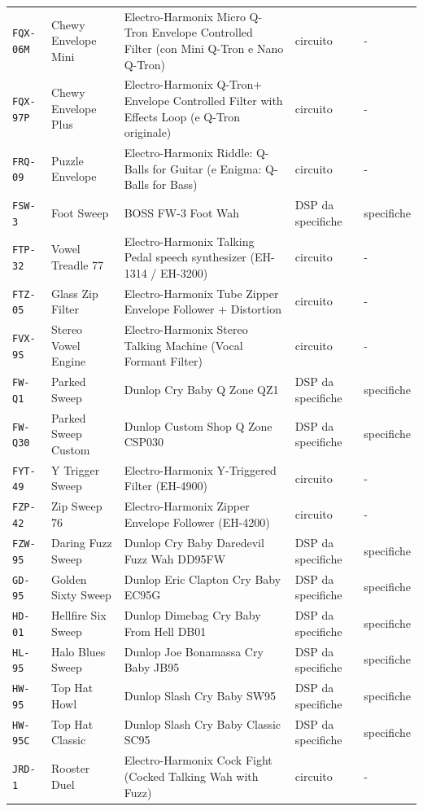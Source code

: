 \begin{xltabular}{\linewidth}{@{}l l X l l@{}}
\texttt{FQX-06M} & Chewy Envelope Mini & Electro-Harmonix Micro Q-Tron Envelope Controlled Filter (con Mini Q-Tron e Nano Q-Tron) & circuito & -\\
\texttt{FQX-97P} & Chewy Envelope Plus & Electro-Harmonix Q-Tron+ Envelope Controlled Filter with Effects Loop (e Q-Tron originale) & circuito & -\\
\texttt{FRQ-09} & Puzzle Envelope & Electro-Harmonix Riddle: Q-Balls for Guitar (e Enigma: Q-Balls for Bass) & circuito & -\\
\texttt{FSW-3} & Foot Sweep & BOSS FW-3 Foot Wah & DSP da specifiche & specifiche\\
\texttt{FTP-32} & Vowel Treadle 77 & Electro-Harmonix Talking Pedal speech synthesizer (EH-1314 / EH-3200) & circuito & -\\
\texttt{FTZ-05} & Glass Zip Filter & Electro-Harmonix Tube Zipper Envelope Follower + Distortion & circuito & -\\
\texttt{FVX-9S} & Stereo Vowel Engine & Electro-Harmonix Stereo Talking Machine (Vocal Formant Filter) & circuito & -\\
\texttt{FW-Q1} & Parked Sweep & Dunlop Cry Baby Q Zone QZ1 & DSP da specifiche & specifiche\\
\texttt{FW-Q30} & Parked Sweep Custom & Dunlop Custom Shop Q Zone CSP030 & DSP da specifiche & specifiche\\
\texttt{FYT-49} & Y Trigger Sweep & Electro-Harmonix Y-Triggered Filter (EH-4900) & circuito & -\\
\texttt{FZP-42} & Zip Sweep 76 & Electro-Harmonix Zipper Envelope Follower (EH-4200) & circuito & -\\
\texttt{FZW-95} & Daring Fuzz Sweep & Dunlop Cry Baby Daredevil Fuzz Wah DD95FW & DSP da specifiche & specifiche\\
\texttt{GD-95} & Golden Sixty Sweep & Dunlop Eric Clapton Cry Baby EC95G & DSP da specifiche & specifiche\\
\texttt{HD-01} & Hellfire Six Sweep & Dunlop Dimebag Cry Baby From Hell DB01 & DSP da specifiche & specifiche\\
\texttt{HL-95} & Halo Blues Sweep & Dunlop Joe Bonamassa Cry Baby JB95 & DSP da specifiche & specifiche\\
\texttt{HW-95} & Top Hat Howl & Dunlop Slash Cry Baby SW95 & DSP da specifiche & specifiche\\
\texttt{HW-95C} & Top Hat Classic & Dunlop Slash Cry Baby Classic SC95 & DSP da specifiche & specifiche\\
\texttt{JRD-1} & Rooster Duel & Electro-Harmonix Cock Fight (Cocked Talking Wah with Fuzz) & circuito & -\\

\end{xltabular}
